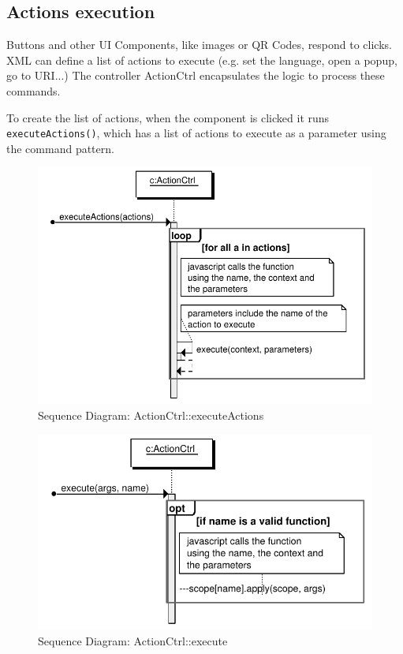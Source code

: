 \subsection{Actions execution}
Buttons and other UI Components, like images or QR Codes, respond to clicks.
\ac{XML} can define a list of actions to execute (e.g. set the language, open a popup, go to \ac{URI}...)
The controller ActionCtrl encapsulates the logic to process these commands.





To create the list of actions, when the component is clicked it runs \lstinline$executeActions()$, which has a list of actions to execute as a parameter using the command pattern.

\begin{figure}[htb]
    \centering
    \includegraphics{figures/design/seqdia/actionCtrl-executeActions.pdf}
    \caption{Sequence Diagram: ActionCtrl::executeActions}
    \label{fig:design-seqdia-actionCtrl-executeActions}
\end{figure}

\begin{figure}[htb]
    \centering
    \includegraphics{figures/design/seqdia/actionCtrl-execute.pdf}
    \caption{Sequence Diagram: ActionCtrl::execute}
    \label{fig:design-seqdia-actionCtrl-execute}
\end{figure}

